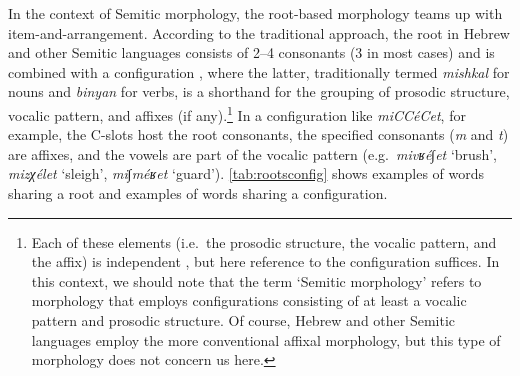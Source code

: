 \documentclass[output=paper,
modfonts
]{LSP/langsci}
\begin{document}
In the context of Semitic morphology, the root-based morphology teams up
with item-and-arrangement. According to the traditional approach, the
root in Hebrew and other Semitic languages consists of 2--4 consonants (3
in most cases) and is combined with a configuration \citep{batel2011a}, where
the latter, traditionally termed \emph{mishkal} for nouns and
\emph{binyan} for verbs, is a shorthand for the grouping of prosodic
structure, vocalic pattern, and affixes (if any).\footnote{Each of these
  elements (i.e.\ the prosodic structure, the vocalic pattern, and the
  affix) is independent \citep{McCarthy1979a,McCarthy1981b}, but here reference to the
  configuration suffices. In this context, we should note that the term
  `Semitic morphology' refers to morphology that employs configurations
  consisting of at least a vocalic pattern and prosodic structure. Of
  course, Hebrew and other Semitic languages employ the more
  conventional affixal morphology, but this type of morphology does not
  concern us here.} In a configuration like \emph{miCCéCet}, for
example, the C-slots host the root consonants, the specified consonants
(\emph{m} and \emph{t}) are affixes, and the vowels are part of the
vocalic pattern (e.g.\ \emph{mivʁé∫et} `brush', \emph{mizχélet} `sleigh',
\emph{mi∫méʁet} `guard'). \cref{tab:rootsconfig} shows examples of words sharing a root and examples of words sharing a configuration.
	
\end{document}
